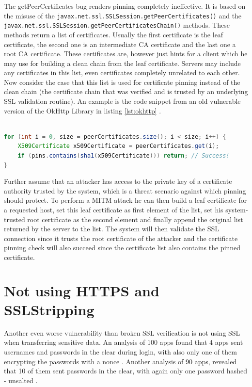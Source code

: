 \documentclass[draft,final]{vutinfth} %
\begin{document}
The getPeerCertificates bug renders pinning completely ineffective. It is based on the misuse of the \texttt{javax.net.ssl.SSLSession.getPeerCertificates()} and the \\
\texttt{javax.net.ssl.SSLSession.getPeerCertificatesChain()} methods. These methods return a list of certificates. Usually the first certificate is the leaf certificate, the second one is an intermediate CA certificate and the last one a root CA certificate. These certificates are, however just hints for a client which he may use for building a clean chain from the leaf certificate. Servers may include any certificates in this list, even certificates completely unrelated to each other. Now consider the case that this list is used for certificate pinning instead of the clean chain (the certificate chain that was verified and is trusted by an underlying SSL validation routine). An example is the code snippet from an old vulnerable version of the OkHttp Library \cite{OkHttp} in listing \ref{lst:okhttp} .
\\\\
\begin{lstlisting}[language=Java,caption={Vulnerable certificate pinning in old OkHttp library},label={lst:okhttp},frame=tb,columns=fullflexible]
for (int i = 0, size = peerCertificates.size(); i < size; i++) {
    X509Certificate x509Certificate = peerCertificates.get(i); 
    if (pins.contains(sha1(x509Certificate))) return; // Success!
}
\end{lstlisting}
Further assume that an attacker has access to the private key of a certificate authority trusted by the system, which is a threat scenario against which pinning should protect. To perform a MITM attack he can then build a leaf certificate for a requested host, set this leaf certificate as first element of the list, set his system-trusted root certificate as the second element and finally append the original list returned by the server to the list. The system will then validate the SSL connection since it trusts the root certificate of the attacker and the certificate pinning check will also succeed since the certificate list also contains the pinned certificate.

\section*{Not using HTTPS and SSLStripping}

Another even worse vulnerability than broken SSL verification is not using SSL when transferring sensitive data. An analysis of 100 apps found that 4 apps sent usernames and passwords in the clear during login, with also only one of them encrypting the passwords with a nonce \cite{Onwuzurike}. Another analysis of 90 apps, revealed that 10 of them sent passwords in the clear, with again only one password hashed - unsalted \cite{Gagnon}.
\end{document}
